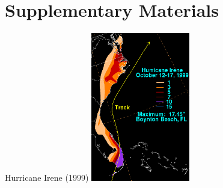 \documentclass[compress,noflama,nosectionpages]{beamer}
\begin{document}
\section{Supplementary Materials}

\begin{frame}{Hurricane Irene (1999)}
	\centering
	\includegraphics[height=6.5cm,keepaspectratio=true,trim= 1mm 0mm 1mm 10mm,clip=TRUE]{images/Irene_1999_rainfall.png}\\
\end{frame}
\end{document}
